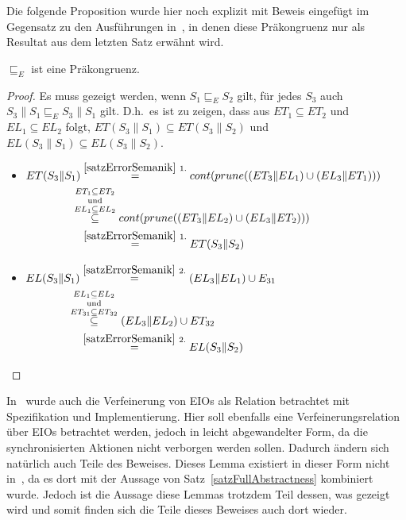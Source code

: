 Die folgende Proposition wurde hier noch explizit mit Beweis eingefügt im
Gegensatz zu den Ausführungen in~\cite{Vogler2014EIO}, in denen diese
Präkongruenz nur als Resultat aus dem letzten Satz erwähnt wird.

\begin{prop}[Präkongruenz]
  \label{korPraekongruenz}
  $\sqsubseteq _E$ ist eine Präkongruenz.
\end{prop}

\begin{proof}
  Es muss gezeigt werden, wenn $S_1\sqsubseteq _E S_2$ gilt, für jedes
  $S_3$ auch
  $S_3\|S_1\sqsubseteq _E S_3\|S_1$ gilt. D.h.\ es ist zu zeigen, dass aus
  $ET_1\subseteq ET_2$ und $EL_1\subseteq EL_2$ folgt, $ET(S_3\|S_1)\subseteq
  ET(S_3\|S_2)$ und $EL(S_3\|S_1)\subseteq EL(S_3\|S_2)$.\\
  \begin{itemize}
    \item $\begin{aligned}[t]
        ET(S_3\|S_1) &\overset{\ref{satzErrorSemanik}~1.}{=}
      cont(prune((ET_3\|EL_1)\cup (EL_3\|ET_1)))\\
      &\hspace{-0.3cm}\overset{ET_1\subseteq
    ET_2}{\overset{\mathrm{und}}{\overset{EL_1\subseteq EL_2}{\subseteq}}}
    cont(prune((ET_3\|EL_2)\cup (EL_3\|ET_2)))\\
      &\overset{\ref{satzErrorSemanik}~1.}{=} ET(S_3\|S_2)
    \end{aligned}$
    \item $\begin{aligned}[t]
        EL(S_3\|S_1) &\overset{\ref{satzErrorSemanik}~2.}{=} (EL_3\|EL_1)\cup
        E_{31}\\
        &\hspace{-0.4cm}\overset{EL_1\subseteq
      EL_2}{\overset{\mathrm{und}}{\overset{ET_{31}\subseteq
      ET_{32}}{\subseteq}}} (EL_3\|EL_2)\cup ET_{32}\\
      &\overset{\ref{satzErrorSemanik}~2.}{=} EL(S_3\|S_2)
    \end{aligned}$
  \end{itemize}
\end{proof}

In~\cite{Vogler2014EIO} wurde auch die Verfeinerung von EIOs als Relation betrachtet
mit Spezifikation und Implementierung. Hier soll ebenfalls eine
Verfeinerungsrelation über EIOs betrachtet werden, jedoch in leicht
abgewandelter Form, da die synchronisierten Aktionen nicht verborgen werden
sollen. Dadurch ändern sich natürlich auch Teile des Beweises. Dieses Lemma
existiert in dieser Form nicht in~\cite{Schlosser2012BA}, da es dort mit der
Aussage von Satz~\ref{satzFullAbstractness} kombiniert wurde. Jedoch ist die
Aussage diese Lemmas trotzdem Teil dessen, was gezeigt wird und somit finden
sich die Teile dieses Beweises auch dort wieder.

